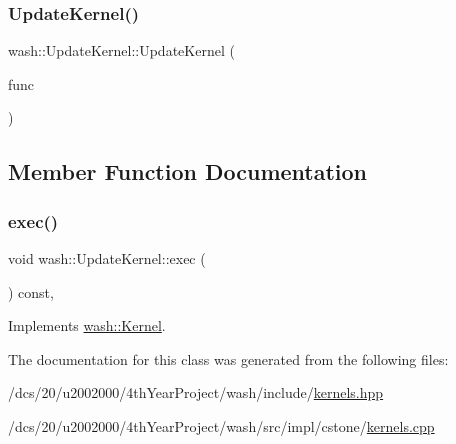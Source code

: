 \subsubsection{\texorpdfstring{Update\+Kernel()}{UpdateKernel()}}
{\footnotesize\ttfamily wash\+::\+Update\+Kernel\+::\+Update\+Kernel (\begin{DoxyParamCaption}\item[{const \mbox{\hyperlink{namespacewash_aaae2f0d4980b7c550d6de709b35f0b8e}{Update\+FuncT}}}]{func }\end{DoxyParamCaption})\hspace{0.3cm}{\ttfamily [inline]}}



\subsection{Member Function Documentation}
\mbox{\label{classwash_1_1UpdateKernel_a72ec6b0ea453d97708f3fcfd98970366}} 
\subsubsection{\texorpdfstring{exec()}{exec()}}
{\footnotesize\ttfamily void wash\+::\+Update\+Kernel\+::exec (\begin{DoxyParamCaption}{ }\end{DoxyParamCaption}) const\hspace{0.3cm}{\ttfamily [override]}, {\ttfamily [virtual]}}



Implements \mbox{\hyperlink{classwash_1_1Kernel_a0ec211840402ce975997b22136f16e39}{wash\+::\+Kernel}}.



The documentation for this class was generated from the following files\+:\begin{DoxyCompactItemize}
\item 
/dcs/20/u2002000/4th\+Year\+Project/wash/include/\mbox{\hyperlink{kernels_8hpp}{kernels.\+hpp}}\item 
/dcs/20/u2002000/4th\+Year\+Project/wash/src/impl/cstone/\mbox{\hyperlink{cstone_2kernels_8cpp}{kernels.\+cpp}}\end{DoxyCompactItemize}
